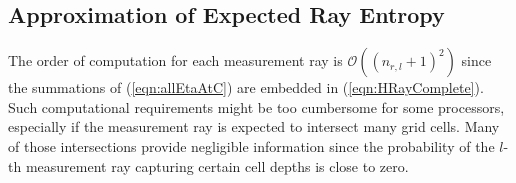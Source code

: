 \documentclass[letterpaper, 10pt, conference]{ieeeconf}
\newcommand{\refeqn}[1]{(\ref{eqn:#1})}
\begin{document}
%


\subsection{Approximation of Expected Ray Entropy}

The order of computation for each measurement ray is $\mathcal O((n_{r,l}+1)^2)$ since the summations of \refeqn{allEtaAtC} are embedded in \refeqn{HRayComplete}. Such computational requirements might be too cumbersome for some processors, especially if the measurement ray is expected to intersect many grid cells. Many of those intersections provide negligible information since the probability of the $l$-th measurement ray capturing certain cell depths is close to zero.
\end{document}
